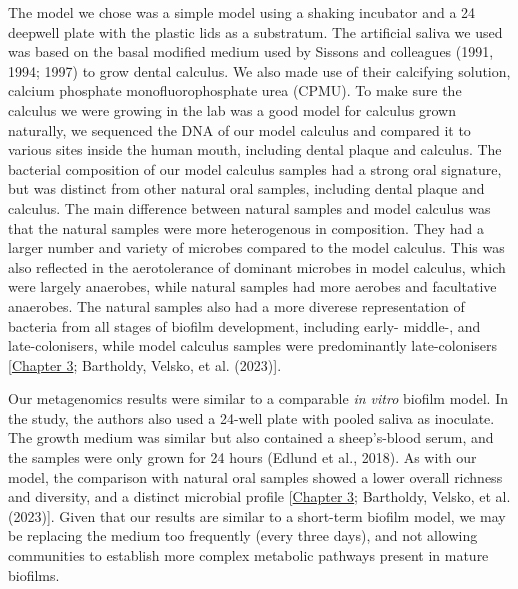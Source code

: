 \documentclass[
  letterpaper,
]{book}
\begin{document}
The model we chose was a simple model using a shaking incubator and a 24
deepwell plate with the plastic lids as a substratum. The artificial
saliva we used was based on the basal modified medium used by Sissons
and colleagues (1991, 1994; 1997) to grow dental calculus. We also made
use of their calcifying solution, calcium phosphate monofluorophosphate
urea (CPMU). To make sure the calculus we were growing in the lab was a
good model for calculus grown naturally, we sequenced the DNA of our
model calculus and compared it to various sites inside the human mouth,
including dental plaque and calculus. The bacterial composition of our
model calculus samples had a strong oral signature, but was distinct
from other natural oral samples, including dental plaque and calculus.
The main difference between natural samples and model calculus was that
the natural samples were more heterogenous in composition. They had a
larger number and variety of microbes compared to the model calculus.
This was also reflected in the aerotolerance of dominant microbes in
model calculus, which were largely anaerobes, while natural samples had
more aerobes and facultative anaerobes. The natural samples also had a
more diverese representation of bacteria from all stages of biofilm
development, including early- middle-, and late-colonisers, while model
calculus samples were predominantly late-colonisers
{[}\protect\hyperlink{byoc-valid}{Chapter 3}; Bartholdy, Velsko, et al.
(2023){]}.

Our metagenomics results were similar to a comparable \emph{in vitro}
biofilm model. In the study, the authors also used a 24-well plate with
pooled saliva as inoculate. The growth medium was similar but also
contained a sheep's-blood serum, and the samples were only grown for 24
hours (Edlund et al., 2018). As with our model, the comparison with
natural oral samples showed a lower overall richness and diversity, and
a distinct microbial profile {[}\protect\hyperlink{byoc-valid}{Chapter
3}; Bartholdy, Velsko, et al. (2023){]}. Given that our results are
similar to a short-term biofilm model, we may be replacing the medium
too frequently (every three days), and not allowing communities to
establish more complex metabolic pathways present in mature biofilms.
\end{document}
